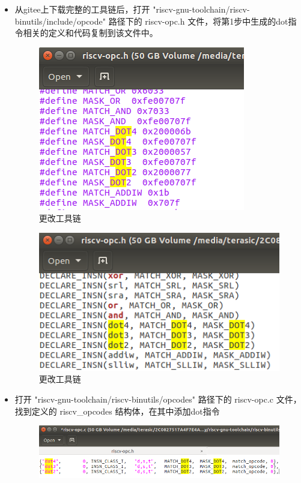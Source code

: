 \documentclass[a4paper, 14pt, oneside]{book} %
\numberwithin{equation}{subsection}
\begin{document}
		\begin{itemize}
			\item 从gitee上下载完整的工具链后，打开 "riscv-gnu-toolchain/riscv-binutils/include/opcode" 路径下的 riscv-opc.h 文件，将第1步中生成的dot指令相关的定义和代码复制到该文件中。
				\begin{figure}[H]
					\centering  
					\includegraphics[scale=0.8]{img/3.png} 
					\caption{更改工具链}
				\end{figure}
				\begin{figure}[H]
					\centering   
					\includegraphics[scale=0.7]{img/4.png} 
					\caption{更改工具链}
				\end{figure}
			\item 打开 "riscv-gnu-toolchain/riscv-binutils/opcodes" 路径下的 riscv-opc.c 文件，找到定义的 riscv\_opcodes 结构体，在其中添加dot指令
				\begin{figure}[H]
					\centering  
					\includegraphics[scale=0.5]{img/5.png} 

\end{figure}
\end{itemize}
\end{document}
